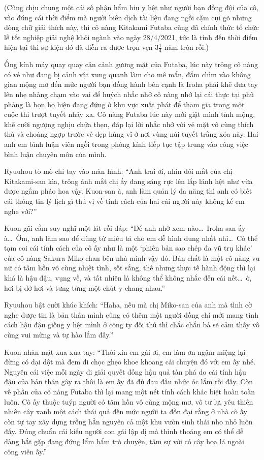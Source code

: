 \documentclass[../main.tex]{subfiles}
\begin{document}
(Cũng chịu chung một cái số phận hẩm hiu y hệt như người bạn đồng đội của cô, vào đúng cái thời điểm mà người biên dịch tài liệu đang ngồi cặm cụi gõ những dòng chữ giải thích này, thì cô nàng Kitakami Futaba cũng đã chính thức tổ chức lễ tốt nghiệp giải nghệ khỏi ngành vào ngày 28/4/2021, tức là tính đến thời điểm hiện tại thì sự kiện đó đã diễn ra được trọn vẹn 3\(\frac14\) năm tròn rồi.)

\chrint


Ống kính máy quay quay cận cảnh gương mặt của Futaba, lúc này trông cô nàng có vẻ như đang bị cảnh vật xung quanh làm cho mê mẩn, đắm chìm vào không gian mộng mơ đến mức người bạn đồng hành bên cạnh là Iroha phải khẽ đưa tay lên nhẹ nhàng chạm vào vai để huých nhắc nhở cô nàng nhớ lại cái thực tại phũ phàng là bọn họ hiện đang đứng ở khu vực xuất phát để tham gia trong một cuộc thi trượt tuyết nhảy xa. Cô nàng Futaba lúc này mới giật mình tỉnh mộng, khẽ cười ngượng nghịu chữa thẹn, đáp lại lời nhắc nhở với vẻ mặt vô cùng thích thú và choáng ngợp trước vẻ đẹp hùng vĩ ở nơi vùng núi tuyết trắng xóa này. Hai anh em bình luận viên ngồi trong phòng kính tiếp tục tập trung vào công việc bình luận chuyên môn của mình.

Ryuuhou tò mò chỉ tay vào màn hình: ``Anh trai ơi, nhìn đôi mắt của chị Kitakami-san kìa, trông ánh mắt chị ấy đang sáng rực lên lấp lánh hệt như vừa được ngắm pháo hoa vậy. Kuon-san à, anh làm quản lý đa năng thì anh có biết cái thông tin lý lịch gì thú vị về tính cách của hai cái người này không kể em nghe với?''

Kuon gãi cằm suy nghĩ một lát rồi đáp: ``Để anh nhớ xem nào\dots\ Iroha-san ấy à\dots\ Ờm, anh làm sao để dùng từ miêu tả cho em dễ hình dung nhất nhỉ\dots\ Có thể tạm coi cái tính cách của cô ấy như là một `phiên bản sao chép đa vũ trụ khác' của cô nàng Sakura Miko-chan bên nhà mình vậy đó. Bản chất là một cô nàng vu nữ có tâm hồn vô cùng nhiệt tình, sốt sắng, thế nhưng thực tế hành động thì lại khá là hậu đậu, vụng về, và tất nhiên là không thể không nhắc đến cái nết\dots\ ờ, hơi bị dở hơi và tưng tửng một chút y chang nhau.''

Ryuuhou bật cười khúc khích: ``Haha, nếu mà chị Miko-san của anh mà tình cờ nghe được tin là bản thân mình cũng có thêm một người đồng chí mới mang tính cách hậu đậu giống y hệt mình ở công ty đối thủ thì chắc chắn bả sẽ cảm thấy vô cùng vui mừng và tự hào lắm đấy.''

Kuon nhăn mặt xua xua tay: ``Thôi xin em gái ơi, em làm ơn ngậm miệng lại đừng có dại dột mà đem đi chọc ghẹo khoe khoang cái chuyện đó với em ấy nhé. Nguyên cái việc mỗi ngày đi giải quyết đống hậu quả tàn phá do cái tính hậu đậu của bản thân gây ra thôi là em ấy đã đủ đau đầu nhức óc lắm rồi đấy. Còn về phần của cô nàng Futaba thì lại mang một nét tính cách khác biệt hoàn toàn luôn. Cô ấy thuộc tuýp người có tâm hồn vô cùng mộng mơ, vô tư lự, yêu thiên nhiên cây xanh một cách thái quá đến mức người ta đồn đại rằng ở nhà cô ấy còn tự tay xây dựng trồng hẳn nguyên cả một khu vườn sinh thái nho nhỏ luôn đấy. Đúng chuẩn cái kiểu người con gái lập dị mà thỉnh thoảng em có thể dễ dàng bắt gặp đang đứng lẩm bẩm trò chuyện, tâm sự với cỏ cây hoa lá ngoài công viên ấy.''
\end{document}
